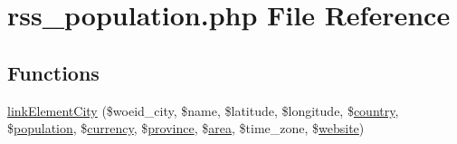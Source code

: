 \hypertarget{rss__population_8php}{}\section{rss\+\_\+population.\+php File Reference}
\label{rss__population_8php}
\subsection*{Functions}
\begin{DoxyCompactItemize}
\item 
\mbox{\hyperlink{rss__population_8php_a80f568297246ccd95f4a6a4a2f7d94f8}{link\+Element\+City}} (\$woeid\+\_\+city, \$name, \$latitude, \$longitude, \$\mbox{\hyperlink{index_8php_a0f0752705301c982dc8994ebc993e6e9}{country}}, \$\mbox{\hyperlink{index_8php_aa78fa356925cd3f67d485c4d6846202b}{population}}, \$\mbox{\hyperlink{index_8php_abd84e0698c321abdbf211d5b8425d0b5}{currency}}, \$\mbox{\hyperlink{index_8php_a38d70414c65575df5643ad4296c9db2e}{province}}, \$\mbox{\hyperlink{index_8php_a5198216176428aa2303311f956213f33}{area}}, \$time\+\_\+zone, \$\mbox{\hyperlink{index_8php_a8c56014cff17c1ced653aa98455da680}{website}})
\end{DoxyCompactItemize}
